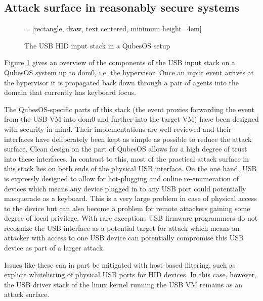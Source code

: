\documentclass[12pt,a4paper,notitlepage]{article}
\begin{document}
\subsection{Attack surface in reasonably secure systems}
\begin{figure}
 = [rectangle, draw, text centered, minimum height=4em]
\label{qubes-hid-stack}
\caption{The USB HID input stack in a QubesOS setup}
\end{figure}

Figure \ref{qubes-hid-stack} gives an overview of the components of the USB input stack on a QubesOS system up to dom0,
i.e. the hypervisor. Once an input event arrives at the hypervisor it is propagated back down through a pair of agents
into the domain that currently has keyboard focus.

The QubesOS-specific parts of this stack (the event proxies forwarding the event from the USB VM into dom0 and further
into the target VM) have been designed with security in mind. Their implementations are well-reviewed and their
interfaces have deliberately been kept as simple as possible to reduce the attack surface. Clean design on the part of
QubesOS allows for a high degree of trust into these interfaces. In contrast to this, most of the practical attack
surface in this stack lies on both ends of the physical USB interface. On the one hand, USB is expressly designed to
allow for hot-plugging and online re-enumeration of devices which means any device plugged in to any USB port could
potentially masquerade as a keyboard. This is a very large problem in case of physical access to the device but can also
become a problem for remote attackers gaining some degree of local privilege. With rare exceptions USB firmware
programmers do not recognize the USB interface as a potential target for attack which means an attacker with access to
one USB device can potentially compromise this USB device as part of a larger attack.

Issues like these can in part be mitigated with host-based filtering, such as explicit whitelisting of physical USB
ports for HID devices. In this case, however, the USB driver stack of the linux kernel running the USB VM remains as an
attack surface.
\end{document}
